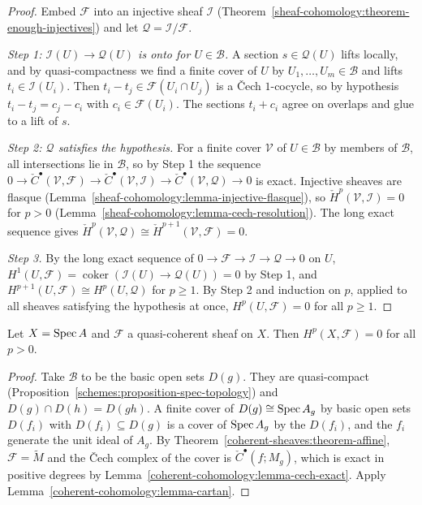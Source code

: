 \begin{proof}
Embed $\mathcal{F}$ into an injective sheaf $\mathcal{I}$ (Theorem~\ref{sheaf-cohomology:theorem-enough-injectives}) and let $\mathcal{Q} = \mathcal{I}/\mathcal{F}$.

\emph{Step 1: $\mathcal{I}(U) \to \mathcal{Q}(U)$ is onto for $U \in \mathcal{B}$.} A section $s \in \mathcal{Q}(U)$ lifts locally, and by quasi-compactness we find a
finite cover of $U$ by $U_1, \ldots, U_m \in \mathcal{B}$ and lifts $t_i \in \mathcal{I}(U_i)$. Then $t_i - t_j \in \mathcal{F}(U_i \cap U_j)$ is a \v{C}ech $1$-cocycle, so by
hypothesis $t_i - t_j = c_j - c_i$ with $c_i \in \mathcal{F}(U_i)$. The sections $t_i + c_i$ agree on overlaps and glue to a lift of $s$.

\emph{Step 2: $\mathcal{Q}$ satisfies the hypothesis.} For a finite cover $\mathcal{V}$ of $U \in \mathcal{B}$ by members of $\mathcal{B}$, all intersections lie in
$\mathcal{B}$, so by Step 1 the sequence $0 \to \check C^\bullet(\mathcal{V}, \mathcal{F}) \to \check C^\bullet(\mathcal{V}, \mathcal{I}) \to \check C^\bullet(\mathcal{V}, \mathcal{Q}) \to 0$
is exact. Injective sheaves are flasque (Lemma~\ref{sheaf-cohomology:lemma-injective-flasque}), so $\check H^p(\mathcal{V}, \mathcal{I}) = 0$ for $p > 0$
(Lemma~\ref{sheaf-cohomology:lemma-cech-resolution}). The long exact sequence gives $\check H^p(\mathcal{V}, \mathcal{Q}) \cong \check H^{p+1}(\mathcal{V}, \mathcal{F}) = 0$.

\emph{Step 3.} By the long exact sequence of $0 \to \mathcal{F} \to \mathcal{I} \to \mathcal{Q} \to 0$ on $U$, $H^1(U, \mathcal{F}) = \operatorname{coker}(\mathcal{I}(U) \to \mathcal{Q}(U)) = 0$
by Step 1, and $H^{p+1}(U, \mathcal{F}) \cong H^p(U, \mathcal{Q})$ for $p \geq 1$. By Step 2 and induction on $p$, applied to all sheaves satisfying the hypothesis at
once, $H^p(U, \mathcal{F}) = 0$ for all $p \geq 1$.
\end{proof}

\begin{theorem}[Serre]\label{coherent-cohomology:theorem-affine-vanishing}
Let $X = \operatorname{Spec} A$ and $\mathcal{F}$ a quasi-coherent sheaf on $X$. Then $H^p(X, \mathcal{F}) = 0$ for all $p > 0$.
\end{theorem}

\begin{proof}
Take $\mathcal{B}$ to be the basic open sets $D(g)$. They are quasi-compact (Proposition~\ref{schemes:proposition-spec-topology}) and
$D(g) \cap D(h) = D(gh)$. A finite cover of $D(g) \cong \operatorname{Spec} A_g$ by basic open sets $D(f_i)$ with $D(f_i) \subseteq D(g)$ is a cover of $\operatorname{Spec} A_g$ by the $D(f_i)$, and the
$f_i$ generate the unit ideal of $A_g$. By Theorem~\ref{coherent-sheaves:theorem-affine}, $\mathcal{F} = \widetilde M$ and the \v{C}ech complex of the cover is
$\check C^\bullet(f; M_g)$, which is exact in positive degrees by Lemma~\ref{coherent-cohomology:lemma-cech-exact}. Apply
Lemma~\ref{coherent-cohomology:lemma-cartan}.
\end{proof}

